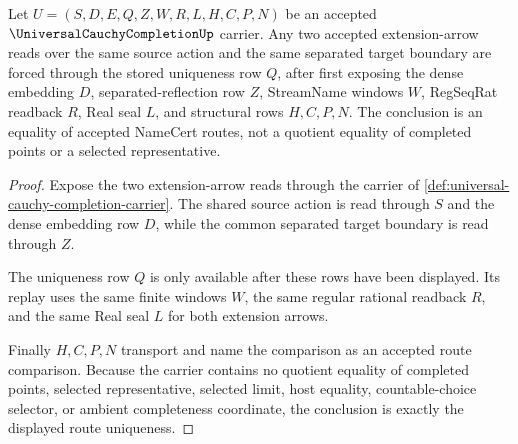 \begin{theorem}
\label{thm:universal-cauchy-completion-universal-property}
Let $U=(S,D,E,Q,Z,W,R,L,H,C,P,N)$ be an accepted $\UniversalCauchyCompletionUp$ carrier. Any two accepted extension-arrow reads over the same source action and the same separated target boundary are forced through the stored uniqueness row $Q$, after first exposing the dense embedding $D$, separated-reflection row $Z$, StreamName windows $W$, RegSeqRat readback $R$, Real seal $L$, and structural rows $H,C,P,N$. The conclusion is an equality of accepted NameCert routes, not a quotient equality of completed points or a selected representative.
\end{theorem}
\begin{proof}
Expose the two extension-arrow reads through the carrier of \autoref{def:universal-cauchy-completion-carrier}. The shared source action is read through $S$ and the dense embedding row $D$, while the common separated target boundary is read through $Z$.

The uniqueness row $Q$ is only available after these rows have been displayed. Its replay uses the same finite windows $W$, the same regular rational readback $R$, and the same Real seal $L$ for both extension arrows.

Finally $H,C,P,N$ transport and name the comparison as an accepted route comparison. Because the carrier contains no quotient equality of completed points, selected representative, selected limit, host equality, countable-choice selector, or ambient completeness coordinate, the conclusion is exactly the displayed route uniqueness.
\end{proof}



